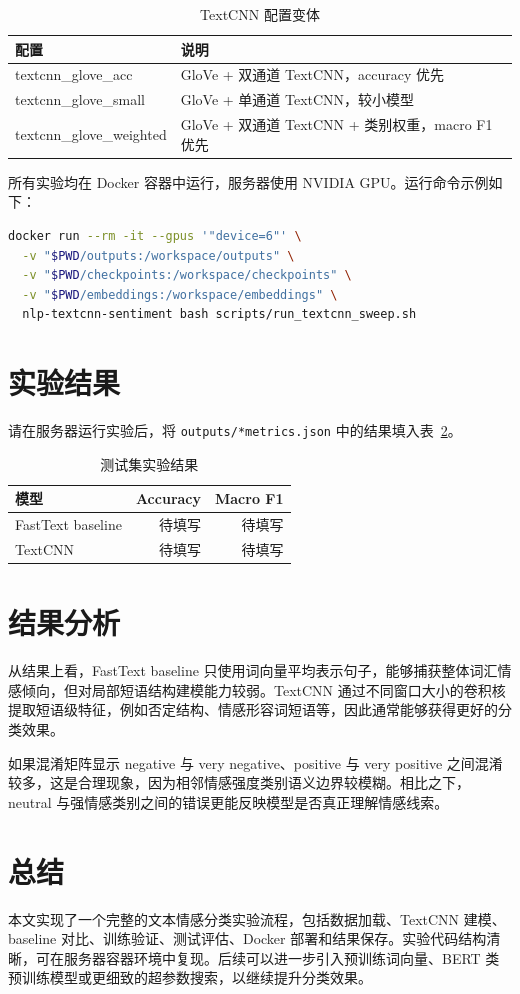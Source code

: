 \documentclass[UTF8,a4paper,12pt]{ctexart}
\begin{document}
\begin{table}[h]
\centering
\caption{TextCNN 配置变体}
\label{tab:variants}
\begin{tabular}{ll}
\toprule
配置 & 说明 \\
\midrule
textcnn\_glove\_acc & GloVe + 双通道 TextCNN，accuracy 优先 \\
textcnn\_glove\_small & GloVe + 单通道 TextCNN，较小模型 \\
textcnn\_glove\_weighted & GloVe + 双通道 TextCNN + 类别权重，macro F1 优先 \\
\bottomrule
\end{tabular}
\end{table}

所有实验均在 Docker 容器中运行，服务器使用 NVIDIA GPU。运行命令示例如下：

\begin{lstlisting}[language=bash]
docker run --rm -it --gpus '"device=6"' \
  -v "$PWD/outputs:/workspace/outputs" \
  -v "$PWD/checkpoints:/workspace/checkpoints" \
  -v "$PWD/embeddings:/workspace/embeddings" \
  nlp-textcnn-sentiment bash scripts/run_textcnn_sweep.sh
\end{lstlisting}

\section{实验结果}

请在服务器运行实验后，将 \texttt{outputs/*metrics.json} 中的结果填入表~\ref{tab:results}。

\begin{table}[h]
\centering
\caption{测试集实验结果}
\label{tab:results}
\begin{tabular}{lrr}
\toprule
模型 & Accuracy & Macro F1 \\
\midrule
FastText baseline & 待填写 & 待填写 \\
TextCNN & 待填写 & 待填写 \\
\bottomrule
\end{tabular}
\end{table}

\section{结果分析}

从结果上看，FastText baseline 只使用词向量平均表示句子，能够捕获整体词汇情感倾向，但对局部短语结构建模能力较弱。TextCNN 通过不同窗口大小的卷积核提取短语级特征，例如否定结构、情感形容词短语等，因此通常能够获得更好的分类效果。

如果混淆矩阵显示 negative 与 very negative、positive 与 very positive 之间混淆较多，这是合理现象，因为相邻情感强度类别语义边界较模糊。相比之下，neutral 与强情感类别之间的错误更能反映模型是否真正理解情感线索。

\section{总结}

本文实现了一个完整的文本情感分类实验流程，包括数据加载、TextCNN 建模、baseline 对比、训练验证、测试评估、Docker 部署和结果保存。实验代码结构清晰，可在服务器容器环境中复现。后续可以进一步引入预训练词向量、BERT 类预训练模型或更细致的超参数搜索，以继续提升分类效果。
\end{document}
